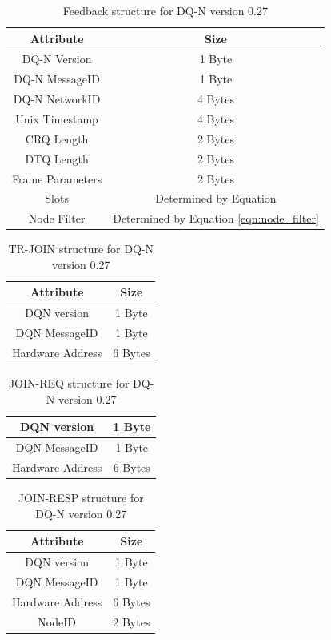 \documentclass{article}
\begin{document}
\begin{table}[H]
\centering
\caption{Feedback structure for DQ-N version 0.27}
\label{app:structure:feedback}
\begin{tabular}{|c|c|}
\hline
Attribute   & Size  \\ \hline \hline
DQ-N Version      & 1 Byte                 \\ \hline
DQ-N MessageID    & 1 Byte                 \\ \hline
DQ-N NetworkID    & 4 Bytes                \\ \hline
Unix Timestamp   & 4 Bytes                \\ \hline
CRQ Length       & 2 Bytes                \\ \hline
DTQ Length       & 2 Bytes                \\ \hline
Frame Parameters & 2 Bytes                \\ \hline
Slots            & Determined by Equation \\ \hline
Node Filter      & Determined by Equation \ref{eqn:node_filter} \\ \hline
\end{tabular}
\end{table}

\begin{table}[H]
\centering
\caption{TR-JOIN structure for DQ-N version 0.27}
\label{app:structure:tr-join}
\begin{tabular}{|c|c|}
\hline
Attribute   & Size  \\ \hline \hline
DQN version   & 1 Byte  \\ \hline
DQN MessageID & 1 Byte  \\ \hline
Hardware Address    & 6 Bytes \\ \hline
\end{tabular}
\end{table}

\begin{table}[H]
\centering
\caption{JOIN-REQ structure for DQ-N version 0.27}
\label{app:structure:join-req}
\begin{tabular}{|c|c|}
\hline
DQN version   & 1 Byte  \\ \hline
DQN MessageID & 1 Byte  \\ \hline
Hardware Address    & 6 Bytes \\ \hline
\end{tabular}
\end{table}

\begin{table}[H]
\centering
\caption{JOIN-RESP structure for DQ-N version 0.27}
\label{app:structure:join-resp}
\begin{tabular}{|c|c|}
\hline
Attribute   & Size  \\ \hline \hline
DQN version   & 1 Byte  \\ \hline
DQN MessageID & 1 Byte  \\ \hline
Hardware Address    & 6 Bytes \\ \hline
NodeID        & 2 Bytes \\ \hline
\end{tabular}
\end{table}
\end{document}
